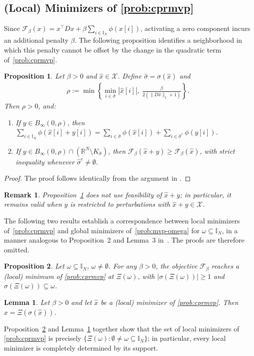 \documentclass[11pt]{article}
\theoremstyle{plain}
\newtheorem{proposition}{Proposition}
\newtheorem{lemma}{Lemma}
\theoremstyle{definition}
\theoremstyle{plain}
\newtheorem{remark}{Remark}
\newcommand{\RR}{{\mathbb R}} %
\newcommand{\II}{{\mathbb I}}
\newcommand{\tpose}[1]{#1^{\top}}
\newcommand{\cF}{{\mathcal F}}
\newcommand{\cX}{{\mathcal X}}
\begin{document}
\subsection{(Local) Minimizers of \texorpdfstring{\eqref{prob:cprmvp}}{P1}}
Since $\cF_\beta(x)=\tpose{x}Dx+
\beta\sum_{i\in\II_N}\phi(x[i])$, activating a zero component incurs an additional penalty $\beta$. The following proposition identifies a neighborhood in which this penalty cannot be offset by the change in the quadratic term of~\eqref{prob:cprmvp}.
\begin{proposition}\label{choiceofrho}
Let $\beta>0$ and $\hat{x}\in\cX$. Define $\hat{\sigma}=\sigma(\hat{x})$ and
\begin{align*}
\rho:=\min\left\{\min_{i\in\hat{\sigma}}|\hat{x}[i]|,\ \frac{\beta}{2(\|D\hat{x}\|_1+1)}\right\}.
\end{align*}
Then $\rho>0$, and:
\begin{enumerate}[label=(\roman*)]
\item If $y\in B_\infty(0,\rho)$, then
$\sum_{i\in\II_N}\phi(\hat{x}[i]+y[i])=\sum_{i\in\hat{\sigma}}\phi(\hat{x}[i])+\sum_{i\in\hat{\sigma}^c}\phi(y[i])$.
\item If $y\in B_\infty(0,\rho)\cap(\RR^N\setminus K_{\hat{\sigma}})$, then $\cF_\beta(\hat{x}+y)\geq \cF_\beta(\hat{x})$, with strict inequality whenever $\hat{\sigma}^c\neq\emptyset$.
\end{enumerate}
\end{proposition}
\begin{proof}
The proof follows identically from the argument in \cite[Lemma~2]{SenAkkayaPinar2025}.
\end{proof}
\begin{remark}
Proposition~\ref{choiceofrho} does not use feasibility of $\hat{x}+y$; in particular, it remains valid when $y$ is restricted to perturbations with $\hat{x}+y\in\cX$.
\end{remark}
The following two results establish a correspondence between local minimizers of~\eqref{prob:cprmvp} and global minimizers of~\eqref{prob:mvp-omega} for $\omega \subseteq \II_N$, in a manner analogous to Proposition~2 and Lemma~3 in~\cite{SenAkkayaPinar2025}. The proofs are therefore omitted.
\begin{proposition}\label{prop:localmin}
Let $\omega\subseteq\II_N$, $\omega\neq\emptyset$. For any $\beta>0$, the objective $\cF_\beta$ reaches a (local) minimum of \eqref{prob:cprmvp} at $\Xi(\omega)$, with $|\sigma(\Xi(\omega))|\geq 1$ and $\sigma(\Xi(\omega))\subseteq \omega$.
\end{proposition}
\begin{lemma}\label{lemma8}
Let $\beta>0$ and let $\hat{x}$ be a (local) minimizer of \eqref{prob:cprmvp}. Then $\hat{x}=\Xi(\sigma(\hat{x}))$.
\end{lemma}
Proposition~\ref{prop:localmin} and Lemma~\ref{lemma8} together show that the set of local minimizers of \eqref{prob:cprmvp} is precisely $\{\Xi(\omega) : \emptyset\neq\omega\subseteq\II_N\}$; in particular, every local minimizer is completely determined by its support.
\end{document}
